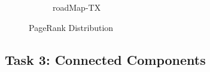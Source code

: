 \begin{figure}
\begin{subfigure}[htbp]{0.9\textwidth}
                \caption{roadMap-TX}
                \label{fig:pr-tx}
        \end{subfigure}
        \caption{PageRank Distribution}
        \label{fig:results2}
\end{figure}





\subsection{Task 3: Connected Components}
